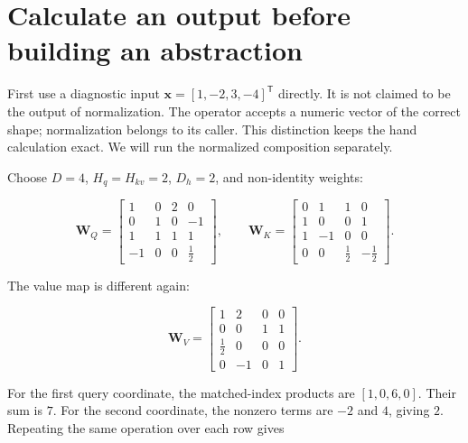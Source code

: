 \section{Calculate an output before building an
abstraction}\label{calculate-an-output-before-building-an-abstraction}


First use a diagnostic input \(\mathbf{x}=[1,-2,3,-4]^{\mathsf T}\)
directly. It is not claimed to be the output of normalization. The
operator accepts a numeric vector of the correct shape; normalization
belongs to its caller. This distinction keeps the hand calculation
exact. We will run the normalized composition separately.

Choose \(D=4\), \(H_q=H_{kv}=2\), \(D_h=2\), and non-identity weights:

\begin{equation}
\mathbf{W}_Q=
\begin{bmatrix}
1&0&2&0\\0&1&0&-1\\1&1&1&1\\-1&0&0&\tfrac12
\end{bmatrix},\qquad
\mathbf{W}_K=
\begin{bmatrix}
0&1&1&0\\1&0&0&1\\1&-1&0&0\\0&0&\tfrac12&-\tfrac12
\end{bmatrix}.
\end{equation}

The value map is different again:

\begin{equation}
\mathbf{W}_V=
\begin{bmatrix}
1&2&0&0\\0&0&1&1\\\tfrac12&0&0&0\\0&-1&0&1
\end{bmatrix}.
\end{equation}

For the first query coordinate, the matched-index products are
\([1,0,6,0]\). Their sum is \(7\). For the second coordinate, the
nonzero terms are \(-2\) and \(4\), giving \(2\). Repeating the same
operation over each row gives


